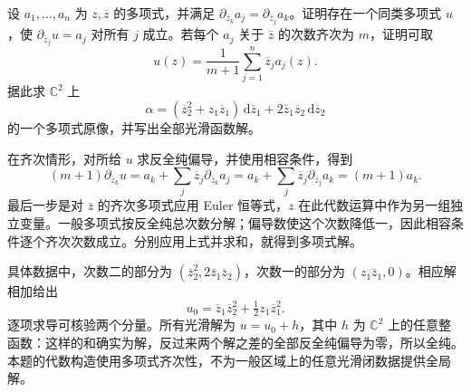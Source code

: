 \begin{exercise}[多项式数据的显式原像]\label{b3:ex:29-5}
设 \(a_1,\ldots,a_n\) 为 \(z,\overline z\) 的多项式，并满足
\(\partial_{\overline z_k}a_j=\partial_{\overline z_j}a_k\)。证明存在一个同类多项式 \(u\)，使 \(\partial_{\overline z_j}u=a_j\) 对所有 \(j\) 成立。若每个 \(a_j\) 关于 \(\overline z\) 的次数齐次为 \(m\)，证明可取
\[
 u(z)=\frac1{m+1}\sum_{j=1}^n\overline z_j a_j(z).
\]
据此求 \(\mathbb C^2\) 上
\[
 \alpha=(\overline z_2^2+z_1\overline z_1)\,\mathrm d\overline z_1
       +2\overline z_1\overline z_2\,\mathrm d\overline z_2
\]
的一个多项式原像，并写出全部光滑函数解。
\end{exercise}
\begin{solution}
在齐次情形，对所给 \(u\) 求反全纯偏导，并使用相容条件，得到
\[
 (m+1)\partial_{\overline z_k}u
 =a_k+\sum_j\overline z_j\partial_{\overline z_k}a_j
 =a_k+\sum_j\overline z_j\partial_{\overline z_j}a_k
 =(m+1)a_k.
\]
最后一步是对 \(\overline z\) 的齐次多项式应用 Euler 恒等式，\(z\) 在此代数运算中作为另一组独立变量。一般多项式按反全纯总次数分解；偏导数使这个次数降低一，因此相容条件逐个齐次次数成立。分别应用上式并求和，就得到多项式解。

具体数据中，次数二的部分为
\((\overline z_2^2,2\overline z_1\overline z_2)\)，次数一的部分为 \((z_1\overline z_1,0)\)。相应解相加给出
\[
 u_0=\overline z_1\overline z_2^2+\tfrac12z_1\overline z_1^2.
\]
逐项求导可核验两个分量。所有光滑解为 \(u=u_0+h\)，其中 \(h\) 为 \(\mathbb C^2\) 上的任意整函数：这样的和确实为解，反过来两个解之差的全部反全纯偏导为零，所以全纯。本题的代数构造使用多项式齐次性，不为一般区域上的任意光滑闭数据提供全局解。
\end{solution}

